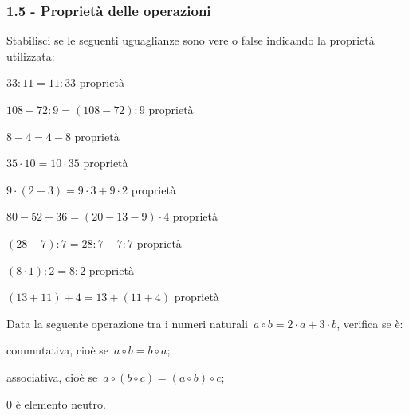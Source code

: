 \subsubsection*{1.5 - Proprietà delle operazioni}
\begin{esercizio}
\label{ese:1.8}
 Stabilisci se le seguenti uguaglianze sono vere o false indicando la proprietà utilizzata:
\TabPositions{5cm}
 \begin{enumeratea}
 \item $33:11=11:33$			\tab proprietà\dotfill\:\boxV\qquad\boxF
 \item $108-72:9=(108-72):9$		\tab proprietà\dotfill\:\boxV\qquad\boxF
 \item $8-4=4-8$			\tab proprietà\dotfill\:\boxV\qquad\boxF
 \item $35\cdot 10=10\cdot 35$	\tab proprietà\dotfill\:\boxV\qquad\boxF
 \item $9\cdot(2+3)=9\cdot3+9\cdot2$ \tab proprietà\dotfill\:\boxV\qquad\boxF
 \item $80-52+36=(20-13-9)\cdot 4$ 	\tab proprietà\dotfill\:\boxV\qquad\boxF
 \item $(28-7):7=28:7-7:7$		\tab proprietà\dotfill\:\boxV\qquad\boxF
 \item $(8\cdot 1):2=8:2$		\tab proprietà\dotfill\:\boxV\qquad\boxF
 \item $(13+11)+4=13+(11+4)$		\tab proprietà\dotfill\:\boxV\qquad\boxF
 \end{enumeratea}
\end{esercizio}

\begin{esercizio}
\label{ese:1.9}
Data la seguente operazione tra i numeri naturali~$a\circ b=2\cdot a +3\cdot b$, verifica se è:
 \begin{enumeratea}
 \item commutativa, cioè se~$a\circ b=b\circ a$;
 \item associativa, cioè se~$a\circ (b\circ c)=(a\circ b)\circ c$;
 \item 0 è elemento neutro.
 \end{enumeratea}
\end{esercizio}

